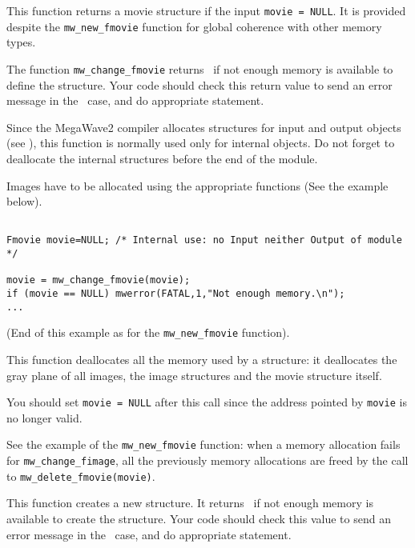\Description
This function returns a movie structure if the input \verb+movie = NULL+.
It is provided despite the \verb+mw_new_fmovie+ function for
global coherence with other memory types.

The function \verb+mw_change_fmovie+ returns \Null\ if not enough memory is available to define the structure. Your code should check this return value to 
send an error message in the \Null\ case, and do appropriate statement.

Since the MegaWave2 compiler allocates structures for input and output 
objects (see \volI), this function is normally used only for internal objects.
Do not forget to deallocate the internal structures before the end
of the module.

Images have to be allocated using the appropriate functions (See the example
below).

\Next
\Example
\begin{verbatim}

Fmovie movie=NULL; /* Internal use: no Input neither Output of module */

movie = mw_change_fmovie(movie);
if (movie == NULL) mwerror(FATAL,1,"Not enough memory.\n");
...
\end{verbatim}
(End of this example as for the \verb+mw_new_fmovie+ function).
\newpage %


\Description
This function deallocates all the memory used by a \fmovie structure:
it deallocates the gray plane of all images, the image structures and
the movie structure itself.

You should set \verb+movie = NULL+ after this call since the address pointed
by \verb+movie+ is no longer valid.

\Next
\Example
See the example of the \verb+mw_new_fmovie+ function: when a memory allocation
fails for \verb+mw_change_fimage+, all the previously memory allocations are
freed by the call to \verb+mw_delete_fmovie(movie)+.

\newpage %


\Description
This function creates a new \fmovie structure.
It returns \Null\ if not enough memory is available to create the structure.
Your code should check this value to send an
error message in the \Null\ case, and do appropriate statement.

